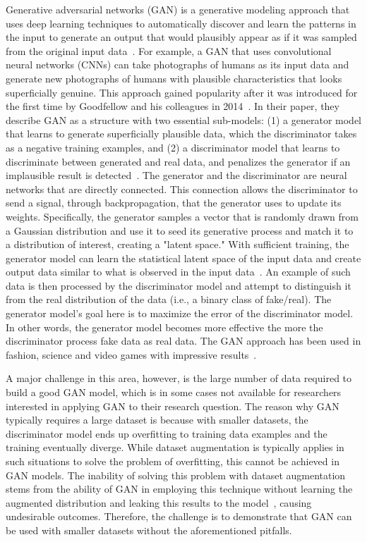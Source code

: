 \documentclass{report}
\begin{document}
Generative adversarial networks (GAN) is a generative modeling approach that uses deep learning techniques to automatically discover and learn the patterns in the input to generate an output that would plausibly appear as if it was sampled from the original input data~\cite{goodfellow2014generative}. For example, a GAN that uses convolutional neural networks (CNNs) can take photographs of humans as its input data and generate new photographs of humans with plausible characteristics that looks superficially genuine. This approach gained popularity after it was introduced for the first time by Goodfellow and his colleagues in 2014~\cite{goodfellow2014generative}. In their paper, they describe GAN as a structure with two essential sub-models: (1) a generator model that learns to generate superficially plausible data, which the discriminator takes as a negative training examples, and (2) a discriminator model that learns to discriminate between generated and real data, and penalizes the generator if an implausible result is detected~\cite{creswell2018generative}. The generator and the discriminator are neural networks that are directly connected. This connection allows the discriminator to send a signal, through backpropagation, that the generator uses to update its weights. Specifically, the generator samples a vector that is randomly drawn from a Gaussian distribution and use it to seed its generative process and match it to a distribution of interest, creating a "latent space." With sufficient training, the generator model can learn the statistical latent space of the input data and create output data similar to what is observed in the input data~\cite{radford2015unsupervised}. An example of such data is then processed by the discriminator model and attempt to distinguish it from the real distribution of the data (i.e., a binary class of fake/real). The generator model's goal here is to maximize the error of the discriminator model. In other words, the generator model becomes more effective the more the discriminator process fake data as real data. The GAN approach has been used in fashion, science and video games with impressive results~\cite{gui2020review}.

A major challenge in this area, however, is the large number of data required to build a good GAN model, which is in some cases not available for researchers interested in applying GAN to their research question. The reason why GAN typically requires a large dataset is because with smaller datasets, the discriminator model ends up overfitting to training data examples and the training eventually diverge. While dataset augmentation is typically applies in such situations to solve the problem of overfitting, this cannot be achieved in GAN models. The inability of solving this problem with dataset augmentation stems from the ability of GAN in employing this technique without learning the augmented distribution and leaking this results to the model~\cite{zhao2020improved}, causing undesirable outcomes. Therefore, the challenge is to demonstrate that GAN can be used with smaller datasets without the aforementioned pitfalls.
\end{document}
